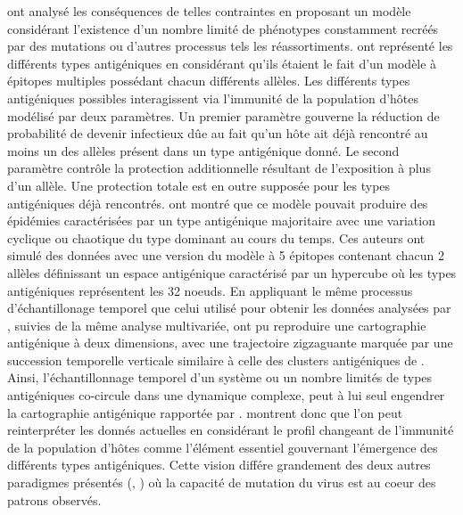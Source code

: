 \citet{Recker2007} ont analysé les conséquences de telles contraintes
en proposant un modèle considérant l'existence d'un nombre limité de
phénotypes constamment recréés par des mutations ou d'autres processus
tels les réassortiments. \citet{Recker2007} ont représenté les
différents types antigéniques en considérant qu'ils étaient le fait
d'un modèle à épitopes multiples possédant chacun différents allèles.
Les différents types antigéniques possibles interagissent via
l'immunité de la population d'hôtes modélisé par deux paramètres. Un
premier paramètre gouverne la réduction de probabilité de devenir
infectieux dûe au fait qu'un hôte ait déjà rencontré au moins un des
allèles présent dans un type antigénique donné. Le second paramètre
contrôle la protection additionnelle résultant de l'exposition à plus
d'un allèle. Une protection totale est en outre supposée pour les
types antigéniques déjà rencontrés. \citet{Recker2007} ont montré que
ce modèle pouvait produire des épidémies caractérisées par un type
antigénique majoritaire avec une variation cyclique ou chaotique du
type dominant au cours du temps. Ces auteurs ont simulé des données
avec une version du modèle à 5 épitopes contenant chacun 2 allèles
définissant un espace antigénique caractérisé par un hypercube où les
types antigéniques représentent les 32 noeuds. En appliquant le même
processus d'échantillonage temporel que celui utilisé pour obtenir les
données analysées par \citet{Smith2004}, suivies de la même analyse
multivariée, \citet{Recker2007} ont pu reproduire une cartographie
antigénique à deux dimensions, avec une trajectoire zigzaguante
marquée par une succession temporelle verticale similaire à celle des
clusters antigéniques de \citet{Smith2004}. Ainsi, l'échantillonnage
temporel d'un système ou un nombre limités de types antigéniques
co-circule dans une dynamique complexe, peut à lui seul engendrer la
cartographie antigénique rapportée par \citet{Smith2004}.
%
\citet{Recker2007} montrent donc que l'on peut reinterpréter les
donnés actuelles en considérant le profil changeant de l'immunité de
la population d'hôtes comme l'élément essentiel gouvernant l'émergence
des différents types antigéniques. Cette vision différe grandement des
deux autres paradigmes présentés (\citet{Koelle2006},
\citet{Ferguson2003}) où la capacité de mutation du virus est au coeur
des patrons observés.

